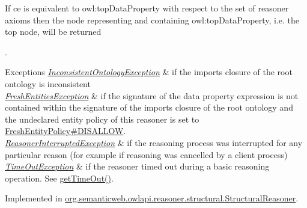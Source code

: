 If {\ttfamily ce} is equivalent to {\ttfamily owl\-:top\-Data\-Property} with respect to the set of reasoner axioms then the node representing and containing {\ttfamily owl\-:top\-Data\-Property}, i.\-e. the top node, will be returned 

.


\begin{DoxyExceptions}{Exceptions}
{\em \hyperlink{classorg_1_1semanticweb_1_1owlapi_1_1reasoner_1_1_inconsistent_ontology_exception}{Inconsistent\-Ontology\-Exception}} & if the imports closure of the root ontology is inconsistent \\
\hline
{\em \hyperlink{classorg_1_1semanticweb_1_1owlapi_1_1reasoner_1_1_fresh_entities_exception}{Fresh\-Entities\-Exception}} & if the signature of the data property expression is not contained within the signature of the imports closure of the root ontology and the undeclared entity policy of this reasoner is set to \hyperlink{enumorg_1_1semanticweb_1_1owlapi_1_1reasoner_1_1_fresh_entity_policy_a762eae6d5b2449d125311ecaabfdc8d0}{Fresh\-Entity\-Policy\#\-D\-I\-S\-A\-L\-L\-O\-W}. \\
\hline
{\em \hyperlink{classorg_1_1semanticweb_1_1owlapi_1_1reasoner_1_1_reasoner_interrupted_exception}{Reasoner\-Interrupted\-Exception}} & if the reasoning process was interrupted for any particular reason (for example if reasoning was cancelled by a client process) \\
\hline
{\em \hyperlink{classorg_1_1semanticweb_1_1owlapi_1_1reasoner_1_1_time_out_exception}{Time\-Out\-Exception}} & if the reasoner timed out during a basic reasoning operation. See \hyperlink{interfaceorg_1_1semanticweb_1_1owlapi_1_1reasoner_1_1_o_w_l_reasoner_a44b2c968f989afe5290db29c90faa164}{get\-Time\-Out()}. \\
\hline
\end{DoxyExceptions}


Implemented in \hyperlink{classorg_1_1semanticweb_1_1owlapi_1_1reasoner_1_1structural_1_1_structural_reasoner_a885655e8d365ff66926491004a123161}{org.\-semanticweb.\-owlapi.\-reasoner.\-structural.\-Structural\-Reasoner}.

